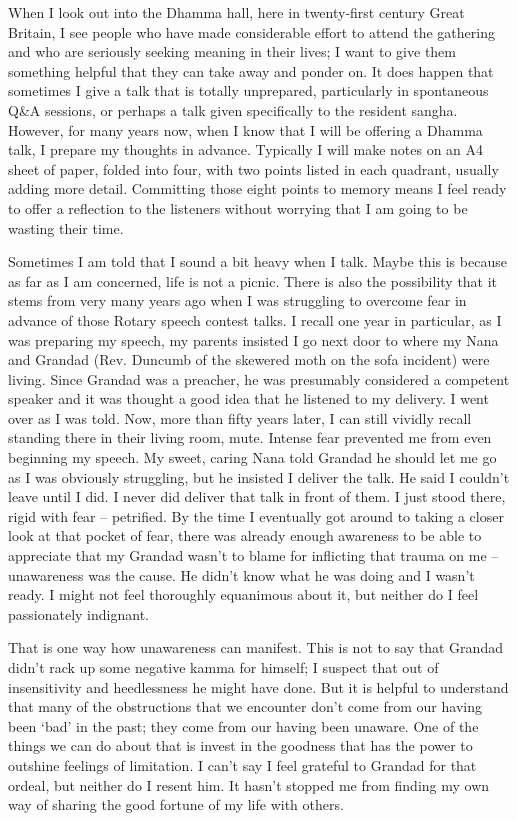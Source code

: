 When I look out into the Dhamma hall, here in twenty-first century Great
Britain, I see people who have made considerable effort to attend the
gathering and who are seriously seeking meaning in their lives; I want
to give them something helpful that they can take away and ponder on. It
does happen that sometimes I give a talk that is totally unprepared,
particularly in spontaneous Q\&A sessions, or perhaps a talk given
specifically to the resident sangha. However, for many years now, when I
know that I will be offering a Dhamma talk, I prepare my thoughts in
advance. Typically I will make notes on an A4 sheet of paper, folded into
four, with two points listed in each quadrant, usually adding more
detail. Committing those eight points to memory means I feel ready to
offer a reflection to the listeners without worrying that I am going to
be wasting their time.

Sometimes I am told that I sound a bit heavy when I talk. Maybe this is
because as far as I am concerned, life is not a picnic. There is also
the possibility that it stems from very many years ago when I was
struggling to overcome fear in advance of those Rotary speech contest
talks. I recall one year in particular, as I was preparing my speech, my
parents insisted I go next door to where my Nana and Grandad (Rev.
Duncumb of the skewered moth on the sofa incident) were living. Since
Grandad was a preacher, he was presumably considered a competent speaker
and it was thought a good idea that he listened to my delivery. I went
over as I was told. Now, more than fifty years later, I can still
vividly recall standing there in their living room, mute. Intense fear
prevented me from even beginning my speech. My sweet, caring Nana
told Grandad he should let me go as I was obviously struggling, but
he insisted I deliver the talk. He said I couldn't leave until I did. I
never did deliver that talk in front of them. I just stood there, rigid
with fear -- petrified. By the time I eventually got around to taking a
closer look at that pocket of fear, there was already enough awareness
to be able to appreciate that my Grandad wasn't to blame for inflicting
that trauma on me -- unawareness was the cause. He didn't know what he
was doing and I wasn't ready. I might not feel thoroughly equanimous
about it, but neither do I feel passionately indignant.

That is one way how unawareness can manifest. This is not to say that Grandad didn't
rack up some negative kamma for himself; I suspect that out of
insensitivity and heedlessness he might have done. But it is helpful to
understand that many of the obstructions that we encounter don't come
from our having been `bad' in the past; they come from our having been
unaware. One of the things we can do about that is invest in the
goodness that has the power to outshine feelings of limitation. I can't
say I feel grateful to Grandad for that ordeal, but neither do I resent
him. It hasn't stopped me from finding my own way of sharing the good
fortune of my life with others.

